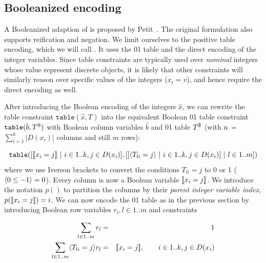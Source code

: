 \documentclass[a4paper,UKenglish,cleveref,autoref,thm-restate]{lipics-v2021}
\begin{document}
\subsection{Booleanized encoding}
\label{sec:encoding:bool}

A Booleanized adaption of \baseGleb is proposed by Petit~\cite{petit}.
The original formulation also supports reification and negation.
We limit ourselves to the positive table encoding, which we will call \baseBool.
It uses the 01 table and the direct encoding of the integer variables.
Since table constraints are typically used over \textit{nominal} integers whose value represent discrete objects, it is likely that other constraints will similarly reason over specific values of the integers (\ie $x_i = v$), and hence require the direct encoding as well.

After introducing the Boolean encoding of the integers $\hat{x}$, we can rewrite the table constraint $\texttt{table}(\hat{x},T)$
into the equivalent Boolean 01 table constraint $\texttt{table}(\hat{b}, T^{\mathbb{B}})$ with Boolean column variables $\hat{b}$ and 01 table $T^{\mathbb{B}}$ (with $n$ = $\sum_{i=1}^{k} |D(x_i)|$ columns and still $m$ rows):

\begin{equation}
  \texttt{table}( [[\![x_i = j]\!] ~|~  i \in 1..k, j \in D(x_i)],  
  [ [ \langle T_{li} = j \rangle  ~|~  i \in 1..k, j \in D(x_i) ]  ~|~  l \in 1..m])
\end{equation}
where we use Iverson brackets to convert the 
conditions $T_{li} = j$ to 0 or 1 (\eg $\langle 0 \leq -1 \rangle = 0$).
Every column is now a Boolean variable $[\![x_i = j]\!]$.
We introduce the notation $p()$ to partition the columns by their \emph{parent integer variable index}, \ie $p([\![x_i = j]\!]) = i$.
We can now encode the 01 table as in the previous section by introducing Boolean row variables $r_l, l \in 1..m$ and constraints

\begin{eqnarray}
\sum_{l \in 1..m} r_l  &= &1 \label{eq:bin:1} \\
\sum_{l \in 1..m} \langle T_{li} = j \rangle r_l &=& [\![x_i = j]\!], \quad\quad i \in 1..k, j \in D(x_i)   \label{eq:bin:2}
\end{eqnarray}
\end{document}
